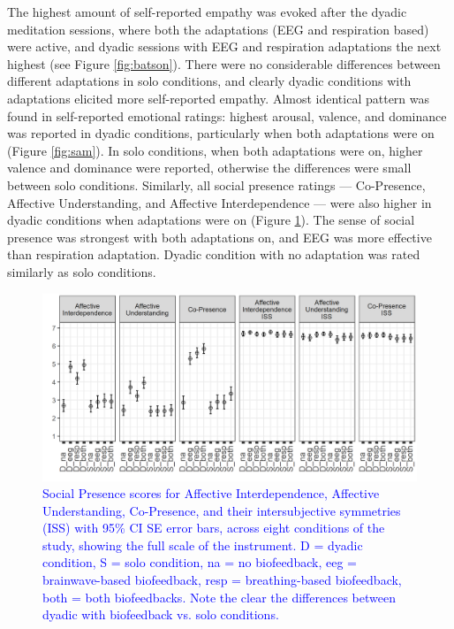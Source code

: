 \documentclass[manuscript, review = false, screen]{acmart}
\begin{document}
The highest amount of self-reported empathy was evoked after the dyadic meditation sessions, where both the adaptations (EEG and respiration based) were active, and dyadic sessions with EEG and respiration adaptations the next highest (see Figure \ref{fig:batson}). There were no considerable differences between different adaptations in solo conditions, and clearly dyadic conditions with adaptations elicited more self-reported empathy. Almost identical pattern was found in self-reported emotional ratings: highest arousal, valence, and dominance was reported in dyadic conditions, particularly when both adaptations were on (Figure \ref{fig:sam}). In solo conditions, when both adaptations were on, higher valence and dominance were reported, otherwise the differences were small between solo conditions. Similarly, all social presence ratings --- Co-Presence, Affective Understanding, and Affective Interdependence --- were also higher in dyadic conditions when adaptations were on (Figure \ref{fig:sp}). The sense of social presence was strongest with both adaptations on, and EEG was more effective than respiration adaptation. Dyadic condition with no adaptation was rated similarly as solo conditions.

\begin{figure}
    \centering
    \includegraphics[width=\textwidth]{images/SP.png}
    \caption{\textcolor{blue}{Social Presence scores for Affective Interdependence, Affective Understanding, Co-Presence, and their intersubjective symmetries (ISS) with 95\% CI SE error bars, across eight conditions of the study, showing the full scale of the instrument. D = dyadic condition, S = solo condition, na = no biofeedback, eeg = brainwave-based biofeedback, resp = breathing-based biofeedback, both = both biofeedbacks. Note the clear the differences between dyadic with biofeedback vs. solo conditions.}}
    \label{fig:sp}
\end{figure}
\end{document}
